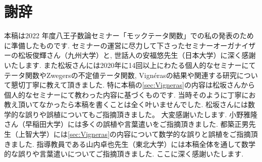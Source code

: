 \documentclass[11pt,b5paper,oneside,lualatex]{ltjsarticle} %
\numberwithin{equation}{section} %
\begin{document}





\section*{謝辞}


本稿は2022 年度八王子数論セミナー「モックテータ関数」での私の発表のために準備したものです. 
セミナーの運営に尽力して下さったセミナーオーガナイザーの松坂俊輝さん（九州大学）と, 世話人の安福悠先生（日本大学）に深く感謝いたします. 
また松坂さんには2020年に14回以上にわたる個人的なセミナーにてテータ関数やZwegersの不定値テータ関数, Vign\'{e}rasの結果や関連する研究について懇切丁寧に教えて頂きました. 
特に本稿の\cref{sec:Vigneras}の内容は松坂さんから個人的なセミナーにて教わった内容に基づくものです. 
当時そのように丁寧にお教え頂いてなかったら本稿を書くことは全く叶いませんでした. 
松坂さんには数学的な誤りや誤植についてもご指摘頂きました。
大変感謝いたします. 
小野雅隆さん（早稲田大学）には多くの誤植や言葉遣いをご指摘頂きました.
都築正男先生（上智大学）には\cref{sec:Vigneras}の内容について数学的な誤りと誤植をご指摘頂きました.
指導教員である山内卓也先生（東北大学）には本稿全体を通して数学的な誤りや言葉遣いについてご指摘頂きました.
ここに深く感謝いたします.





\end{document}
